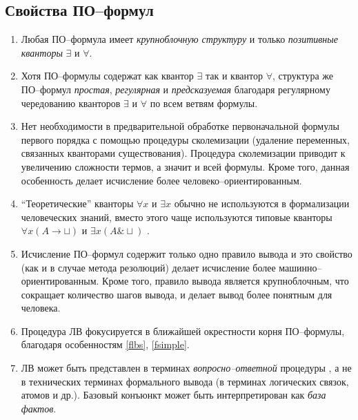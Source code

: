 \subsection{Свойства ПО--формул}

\begin{enumerate}
\item\label{flbs} Любая ПО--формула имеет {\em крупноблочную структуру} и только {\em позитивные кванторы} $\exists$ и $\forall$.
%
\item\label{fsimple} Хотя ПО--формулы содержат как квантор $\exists$ так и квантор $\forall$, структура же ПО--формул {\em простая}, {\em регулярная} и {\em предсказуемая} благодаря регулярному чередованию кванторов $\exists$ и $\forall$ по всем ветвям формулы.
%
\item Нет необходимости в предварительной обработке первоначальной формулы первого порядка с помощью процедуры сколемизации (удаление переменных, связанных кванторами существования). Процедура сколемизации приводит к увеличению сложности термов, а значит и всей формулы. Кроме того, данная особенность делает исчисление более человеко--ориентированным.
%
\item ``Теоретические'' кванторы $\forall x$ и $\exists x$ обычно не используются в формализации человеческих знаний, вместо этого чаще используются типовые кванторы $\forall x(A \rightarrow \sqcup)$ и $\exists x(A \& \sqcup)$ \cite{Bourbaki, ICDS2000, NNN}.
%
\item\label{frule} Исчисление ПО--формул содержит только одно правило вывода и это свойство (как и в случае метода резолюций) делает исчисление более машинно--ориентированным. Кроме того, правило вывода является крупноблочным, что сокращает количество шагов вывода, и делает вывод более понятным для человека.
%
\item\label{froot} Процедура ЛВ фокусируется в ближайшей окрестности корня ПО--формулы, благодаря особенностям \ref{flbs}, \ref{fsimple}.
%
\item\label{fqa} ЛВ может быть представлен в терминах {\em вопросно--ответной} процедуры \cite{ICDS2000}, а не в технических терминах формального вывода (в терминах логических связок, атомов и др.). Базовый конъюнкт может быть интерпретирован как {\em база фактов}.

\end{enumerate}
